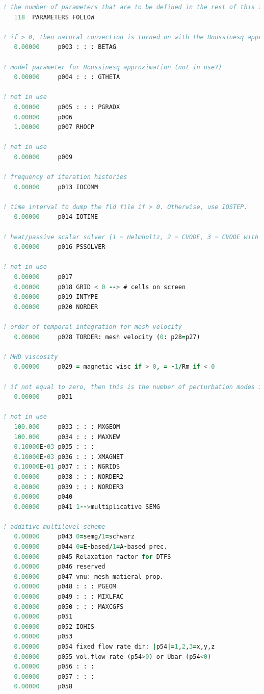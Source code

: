\documentclass[10pt]{article}
\numberwithin{equation}{section} %
\begin{document}
\begin{itemize}
\begin{lstlisting}[language=Fortran]
! the number of parameters that are to be defined in the rest of this file. In order to read these correctly, you cannot have any blank lines, since this determines how many lines to read. For commenting purposes, this is ignored here.
   118  PARAMETERS FOLLOW

! if > 0, then natural convection is turned on with the Boussinesq approximation (not in use?)
   0.00000     p003 : : : BETAG
   
! model parameter for Boussinesq approximation (not in use?)
   0.00000     p004 : : : GTHETA
   
! not in use
   0.00000     p005 : : : PGRADX
   0.00000     p006
   1.00000     p007 RHOCP
   
! not in use
   0.00000     p009
  
! frequency of iteration histories
   0.00000     p013 IOCOMM
   
! time interval to dump the fld file if > 0. Otherwise, use IOSTEP. 
   0.00000     p014 IOTIME
   
! heat/passive scalar solver (1 = Helmholtz, 2 = CVODE, 3 = CVODE with user-supplied Jacobian. A negative number sets source terms to zero), and 0 is default.
   0.00000     p016 PSSOLVER

! not in use
   0.00000     p017
   0.00000     p018 GRID < 0 --> # cells on screen
   0.00000     p019 INTYPE
   0.00000     p020 NORDER

! order of temporal integration for mesh velocity
   0.00000     p028 TORDER: mesh velocity (0: p28=p27)
   
! MHD viscosity
   0.00000     p029 = magnetic visc if > 0, = -1/Rm if < 0

! if not equal to zero, then this is the number of perturbation modes in linearized N-S
   0.00000     p031
   
! not in use
   100.000     p033 : : : MXGEOM
   100.000     p034 : : : MAXNEW
   0.10000E-03 p035 : : :
   0.10000E-03 p036 : : : XMAGNET
   0.10000E-01 p037 : : : NGRIDS
   0.00000     p038 : : : NORDER2
   0.00000     p039 : : : NORDER3
   0.00000     p040
   0.00000     p041 1-->multiplicative SEMG
   
! additive multilevel scheme
   0.00000     p043 0=semg/1=schwarz
   0.00000     p044 0=E-based/1=A-based prec.
   0.00000     p045 Relaxation factor for DTFS
   0.00000     p046 reserved
   0.00000     p047 vnu: mesh matieral prop.
   0.00000     p048 : : : PGEOM
   0.00000     p049 : : : MIXLFAC
   0.00000     p050 : : : MAXCGFS
   0.00000     p051
   0.00000     p052 IOHIS
   0.00000     p053
   0.00000     p054 fixed flow rate dir: |p54|=1,2,3=x,y,z
   0.00000     p055 vol.flow rate (p54>0) or Ubar (p54<0)
   0.00000     p056 : : :
   0.00000     p057 : : :
   0.00000     p058


\end{lstlisting}
\end{itemize}
\end{document}
